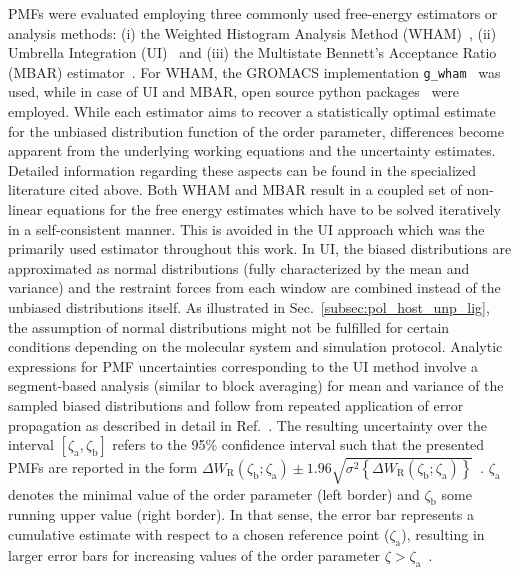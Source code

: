 \documentclass[9pt,lessons,pubversion]{livecoms}
\begin{document}
PMFs were evaluated employing three commonly used free-energy estimators or analysis methods: 
(i) the Weighted Histogram Analysis Method (WHAM)~\cite{ferrenberg1989ferrenberg, kumar1992weighted, roux1995calculation}, 
(ii) Umbrella Integration (UI)~\cite{billeter2000computer, kastner2005bridging, kastner2006analysis} and 
(iii) the Multistate Bennett's Acceptance Ratio (MBAR) estimator~\cite{shirts2008statistically}.
For WHAM, the GROMACS implementation \texttt{g\_wham}~\cite{hub2010g_wham} was used, while in case of UI and MBAR, open source python packages~\cite{umbrellaintgit, pymbargit} were employed.
While each estimator aims to recover a statistically optimal estimate for the unbiased distribution function of the order parameter, differences become apparent from the underlying working equations and the uncertainty estimates.
Detailed information regarding these aspects can be found in the specialized literature cited above.
Both WHAM and MBAR result in a coupled set of non-linear equations for the free energy estimates which have to be solved iteratively in a self-consistent manner.
This is avoided in the UI approach which was the primarily used estimator throughout this work. 
In UI, the biased distributions are approximated as normal distributions (fully characterized by the mean and variance) 
and the restraint forces from each window are combined instead of the unbiased distributions itself.
As illustrated in Sec.~\ref{subsec:pol_host_unp_lig}, the assumption of normal distributions might not be fulfilled for certain conditions depending on the molecular system and simulation protocol.
Analytic expressions for PMF uncertainties corresponding to the UI method involve a segment-based analysis (similar to block averaging) for mean and variance of the sampled biased distributions and  
follow from repeated application of error propagation as described in detail in Ref.~.
The resulting uncertainty over the interval $\left[\zeta_\mathrm{a}, \zeta_\mathrm{b} \right]$ refers to the 95$\%$ confidence interval such that the presented PMFs are reported in the form 
$\Delta W_\mathrm{R}(\zeta_\mathrm{b};  \zeta_\mathrm{a}) \pm 1.96 \sqrt{\sigma^2 \left \{ \Delta W_\mathrm{R}(\zeta_\mathrm{b};  \zeta_\mathrm{a}) \right \}}$~\cite{kastner2006analysis}.
$\zeta_\mathrm{a}$ denotes the minimal value of the order parameter (left border) and $\zeta_\mathrm{b}$ some running upper value (right border).
In that sense, the error bar represents a cumulative estimate with respect to a chosen reference point ($\zeta_\mathrm{a}$), resulting in larger error bars for increasing values of the order parameter 
$\zeta > \zeta_\mathrm{a}$~\cite{kastner2006analysis}.
\end{document}
